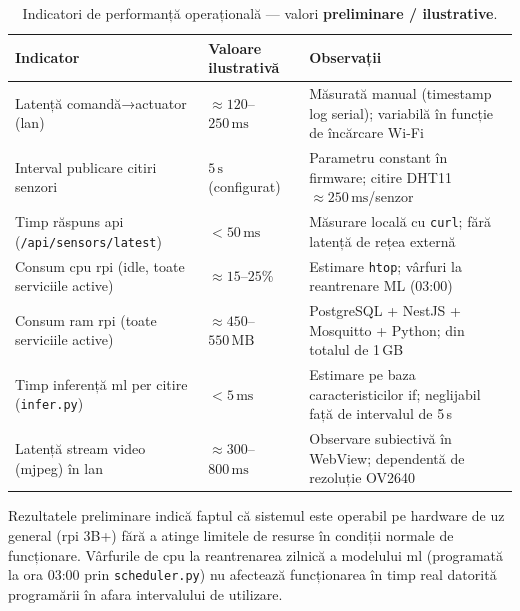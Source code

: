 \begin{table}[H]
  \centering
  \caption{Indicatori de performanță operațională — valori \textbf{preliminare / ilustrative}.}
  \label{tab:performanta}
  \small
  \begin{tabular}{p{5.0cm} p{3.2cm} p{4.4cm}}
    \toprule
    \textbf{Indicator} & \textbf{Valoare ilustrativă} & \textbf{Observații} \\
    \midrule
    Latență comandă→actuator (\gls{lan}) &
      $\approx 120$–$250\,\text{ms}$ &
      Măsurată manual (timestamp log serial); variabilă în funcție de încărcare Wi-Fi \\
    \addlinespace
    Interval publicare citiri senzori &
      $5\,\text{s}$ (configurat) &
      Parametru constant în firmware; citire DHT11 $\approx 250\,\text{ms}$/senzor \\
    \addlinespace
    Timp răspuns \gls{api} (\texttt{/api/sensors/latest}) &
      $< 50\,\text{ms}$ &
      Măsurare locală cu \texttt{curl}; fără latență de rețea externă \\
    \addlinespace
    Consum \gls{cpu} \gls{rpi} (idle, toate serviciile active) &
      $\approx 15$–$25\%$ &
      Estimare \texttt{htop}; vârfuri la reantrenare ML (03:00) \\
    \addlinespace
    Consum \gls{ram} \gls{rpi} (toate serviciile active) &
      $\approx 450$–$550\,\text{MB}$ &
      PostgreSQL + NestJS + Mosquitto + Python; din totalul de 1\,GB \\
    \addlinespace
    Timp inferență \gls{ml} per citire (\texttt{infer.py}) &
      $< 5\,\text{ms}$ &
      Estimare pe baza caracteristicilor \gls{if}; neglijabil față de intervalul de 5\,s \\
    \addlinespace
    Latență stream video (\gls{mjpeg}) în \gls{lan} &
      $\approx 300$–$800\,\text{ms}$ &
      Observare subiectivă în WebView; dependentă de rezoluție OV2640 \\
    \bottomrule
  \end{tabular}
\end{table}

Rezultatele preliminare indică faptul că sistemul este operabil pe hardware de uz general (\gls{rpi}
3B+) fără a atinge limitele de resurse în condiții normale de funcționare. Vârfurile de \gls{cpu}
la reantrenarea zilnică a modelului \gls{ml} (programată la ora 03:00 prin \texttt{scheduler.py})
nu afectează funcționarea în timp real datorită programării în afara intervalului de utilizare.

